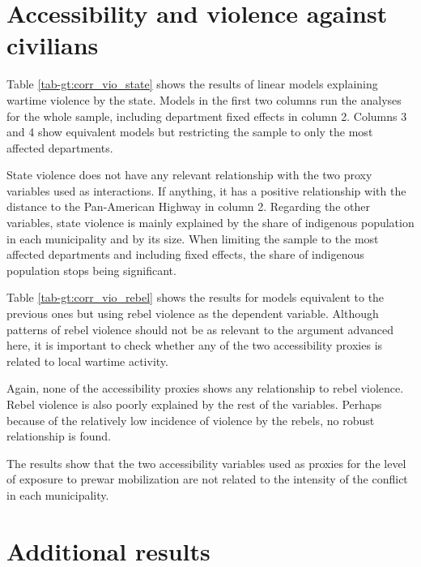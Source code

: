 \documentclass[a4paper, 12pt, notitlepage]{article}
\begin{document}
\clearpage
\section{Accessibility and violence against civilians}

Table \ref{tab-gt:corr_vio_state} shows the results of linear models explaining wartime violence by the state.
Models in the first two columns run the analyses for the whole sample, including department fixed effects in column 2.
Columns 3 and 4 show equivalent models but restricting the sample to only the most affected departments.

State violence does not have any relevant relationship with the two proxy variables used as interactions.
If anything, it has a positive relationship with the distance to the Pan-American Highway in column 2.
Regarding the other variables, state violence is mainly explained by the share of indigenous population in each municipality and by its size.
When limiting the sample to the most affected departments and including fixed effects, the share of indigenous population stops being significant.

Table \ref{tab-gt:corr_vio_rebel} shows the results for models equivalent to the previous ones but using rebel violence as the dependent variable.
Although patterns of rebel violence should not be as relevant to the argument advanced here, it is important to check whether any of the two accessibility proxies is related to local wartime activity.

Again, none of the accessibility proxies shows any relationship to rebel violence.
Rebel violence is also poorly explained by the rest of the variables.
Perhaps because of the relatively low incidence of violence by the rebels, no robust relationship is found.

The results show that the two accessibility variables used as proxies for the level of exposure to prewar mobilization are not related to the intensity of the conflict in each municipality.



\clearpage
\section{Additional results}
\end{document}
